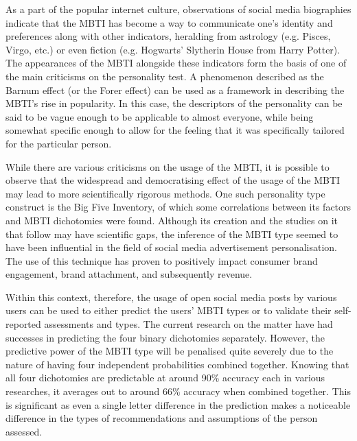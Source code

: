 \documentclass[11pt,a4paper]{article}
\begin{document}
	As a part of the popular internet culture, observations of social media biographies indicate that the MBTI has become a way to communicate one’s identity and preferences along with other indicators, heralding from astrology (e.g. Pisces, Virgo, etc.) or even fiction (e.g. Hogwarts’ Slytherin House from Harry Potter). The appearances of the MBTI alongside these indicators form the basis of one of the main criticisms on the personality test. A phenomenon described as the Barnum effect (or the Forer effect) can be used as a framework in describing the MBTI’s rise in popularity.\autocite{tobacykParanormalBeliefsBarnum1988} In this case, the descriptors of the personality can be said to be vague enough to be applicable to almost everyone, while being somewhat specific enough to allow for the feeling that it was specifically tailored for the particular person.
	
	While there are various criticisms on the usage of the MBTI, it is possible to observe that the widespread and democratising effect of the usage of the MBTI may lead to more scientifically rigorous methods. One such personality type construct is the Big Five Inventory, of which some correlations between its factors and MBTI dichotomies were found.\autocite{costajrRevisedNeoPersonality2008} Although its creation and the studies on it that follow may have scientific gaps, the inference of the MBTI type seemed to have been influential in the field of social media advertisement personalisation.\autocite{yiMBTIBasedCollaborativeRecommendation2016} The use of this technique has proven to positively impact consumer brand engagement, brand attachment, and subsequently revenue.\autocite{yoonEffectBigFive2018}
	
	Within this context, therefore, the usage of open social media posts by various users can be used to either predict the users’ MBTI types or to validate their self-reported assessments and types. The current research on the matter have had successes in predicting the four binary dichotomies separately.\autocite{yamadaIncorporatingTextualInformation2019} However, the predictive power of the MBTI type will be penalised quite severely due to the nature of having four independent probabilities combined together. Knowing that all four dichotomies are predictable at around 90\% accuracy each in various researches, it averages out to around 66\% accuracy when combined together.\autocite{choongPredictingJudgingperceivingMyersBriggs2021} This is significant as even a single letter difference in the prediction makes a noticeable difference in the types of recommendations and assumptions of the person assessed.\autocite{choongPredictingJudgingperceivingMyersBriggs2021}
	
\end{document}
